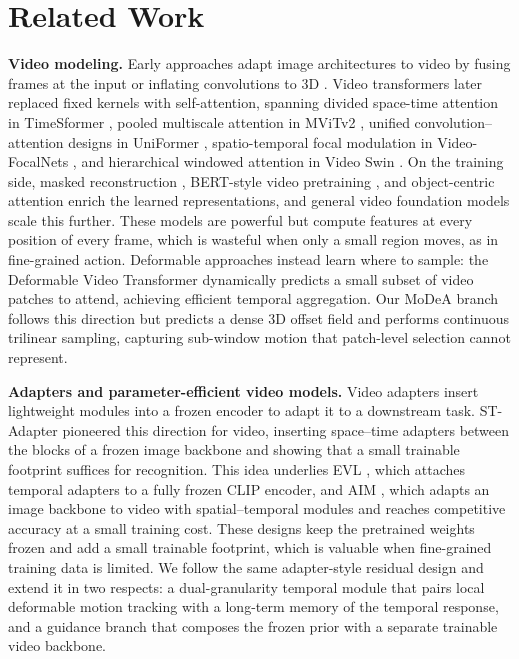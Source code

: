 \section{Related Work}
\label{sec:related}

\textbf{Video modeling.}
Early approaches adapt image architectures to video by fusing frames at the
input or inflating convolutions to 3D \cite{tsm2018,carreira2017slowfast}.
Video transformers later replaced fixed kernels with self-attention, spanning
divided space-time attention in TimeSformer \cite{bertasius2021timesformer},
pooled multiscale attention in MViTv2 \cite{li2022mvitv2}, unified
convolution--attention designs in UniFormer \cite{li2022uniformer},
spatio-temporal focal modulation in Video-FocalNets \cite{videofocalnets2023},
and hierarchical windowed attention in Video Swin \cite{liu2022videoswin}.
On the training side, masked reconstruction \cite{tong2022videomae},
BERT-style video pretraining \cite{wang2022bevt}, and object-centric
attention \cite{orvit2022} enrich the learned representations, and general
video foundation models \cite{wang2024internvideo} scale this further. These
models are powerful but compute
features at every position of every frame, which is wasteful when only a
small region moves, as in fine-grained action. Deformable approaches instead
learn where to sample: the Deformable Video Transformer \cite{dvt2022}
dynamically predicts a small subset of video patches to attend, achieving
efficient temporal aggregation. Our MoDeA branch follows this direction but
predicts a dense 3D offset field and performs continuous trilinear sampling,
capturing sub-window motion that patch-level selection cannot represent.

\textbf{Adapters and parameter-efficient video models.}
Video adapters insert lightweight modules into a frozen encoder to adapt it
to a downstream task. ST-Adapter \cite{pan2022stadapter} pioneered this
direction for video, inserting space--time adapters between the blocks of a
frozen image backbone and showing that a small trainable footprint suffices
for recognition. This idea underlies EVL \cite{lin2022evl}, which
attaches temporal adapters to a fully frozen CLIP encoder, and AIM
\cite{yang2023aim}, which adapts an image backbone to video with
spatial--temporal modules and reaches competitive accuracy at a small
training cost. These designs keep the pretrained weights frozen and add a
small trainable footprint, which is valuable when fine-grained training data
is limited. We follow the same adapter-style residual design and extend it in
two respects: a dual-granularity temporal module that pairs local deformable
motion tracking with a long-term memory of the temporal response, and a
guidance branch that composes the frozen prior with a separate trainable
video backbone.

